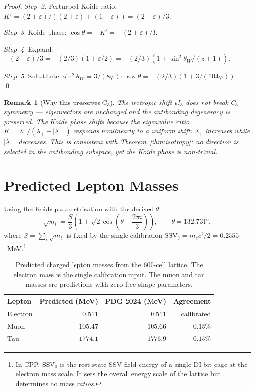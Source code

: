 \documentclass[11pt,letterpaper]{article}
\newtheorem{remark}[theorem]{Remark}
\newcommand{\SSV}{\mathrm{SSV}}
\newcommand{\phig}{\varphi}
\begin{document}
\begin{proof}
\noindent\emph{Step~2.} Perturbed Koide ratio: $K' = (2{+}\varepsilon)/((2{+}\varepsilon) + (1{-}\varepsilon)) = (2{+}\varepsilon)/3$.

\noindent\emph{Step~3.} Koide phase: $\cos\theta = -K' = -(2{+}\varepsilon)/3$.

\noindent\emph{Step~4.} Expand: $-(2{+}\varepsilon)/3 = -(2/3)(1 + \varepsilon/2) = -(2/3)(1 + \sin^2\theta_W/(z{+}1))$.

\noindent\emph{Step~5.} Substitute $\sin^2\theta_W = 3/(8\phig)$: $\cos\theta = -(2/3)(1 + 3/(104\phig))$. \qed
\end{proof}

\begin{remark}[Why this preserves C$_3$]
The isotropic shift $\varepsilon I_3$ does not break C$_3$ symmetry --- eigenvectors are unchanged and the antibonding degeneracy is preserved. The Koide phase shifts because the eigenvalue \emph{ratio} $K = \lambda_+/(\lambda_+ + |\lambda_-|)$ responds nonlinearly to a uniform shift: $\lambda_+$ increases while $|\lambda_-|$ decreases. This is consistent with Theorem~\ref{thm:isotropy}: no direction is selected in the antibonding subspace, yet the Koide phase is non-trivial.
\end{remark}

\section{Predicted Lepton Masses}
\label{sec:masses}
Using the Koide parametrisation with the derived $\theta$:
\begin{equation}
\sqrt{m_i} = \frac{S}{3}\left(1 + \sqrt{2}\cos\!\left(\theta + \frac{2\pi i}{3}\right)\right), \qquad \theta = 132.731°,
\end{equation}
where $S = \sum_i\sqrt{m_i}$ is fixed by the single calibration $\SSV_0 = m_e c^2/2 = 0.2555$~MeV.\footnote{In CPP, $\SSV_0$ is the rest-state SSV field energy of a single DI-bit cage at the electron mass scale. It sets the overall energy scale of the lattice but determines no mass \emph{ratios}.}

\begin{table}[H]
\centering
\caption{Predicted charged lepton masses from the 600-cell lattice. The electron mass is the single calibration input. The muon and tau masses are predictions with zero free shape parameters.}
\label{tab:masses}
\begin{tabular}{@{}lrrr@{}}
\toprule
Lepton & Predicted (MeV) & PDG 2024 (MeV) & Agreement \\
\midrule
Electron & $0.511$ & $0.511$ & calibrated \\
Muon & $105.47$ & $105.66$ & $0.18\%$ \\
Tau & $1774.1$ & $1776.9$ & $0.15\%$ \\
\bottomrule
\end{tabular}
\end{table}
\end{document}
